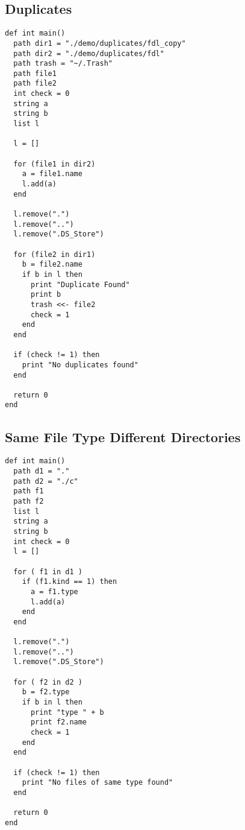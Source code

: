 \documentclass[11pt]{article}
\begin{document}
\newpage

\subsection{Duplicates}

\begin{listing}[H]
  \begin{verbatim}
def int main()
  path dir1 = "./demo/duplicates/fdl_copy"
  path dir2 = "./demo/duplicates/fdl"
  path trash = "~/.Trash"
  path file1
  path file2
  int check = 0
  string a
  string b
  list l

  l = []

  for (file1 in dir2)
    a = file1.name
    l.add(a)
  end

  l.remove(".")
  l.remove("..")
  l.remove(".DS_Store")

  for (file2 in dir1)
    b = file2.name
    if b in l then
      print "Duplicate Found"
      print b
      trash <<- file2
      check = 1
    end
  end

  if (check != 1) then
    print "No duplicates found"
  end

  return 0
end
  \end{verbatim}
\end{listing}

\subsection{Same File Type Different Directories}

\begin{listing}[H]
  \begin{verbatim}
def int main()
  path d1 = "."
  path d2 = "./c"
  path f1
  path f2
  list l
  string a
  string b
  int check = 0
  l = []

  for ( f1 in d1 )
    if (f1.kind == 1) then
      a = f1.type
      l.add(a)
    end
  end

  l.remove(".")
  l.remove("..")
  l.remove(".DS_Store")

  for ( f2 in d2 )
    b = f2.type
    if b in l then
      print "type " + b
      print f2.name
      check = 1
    end
  end

  if (check != 1) then
    print "No files of same type found"
  end

  return 0
end
  \end{verbatim}
\end{listing}
\end{document}
